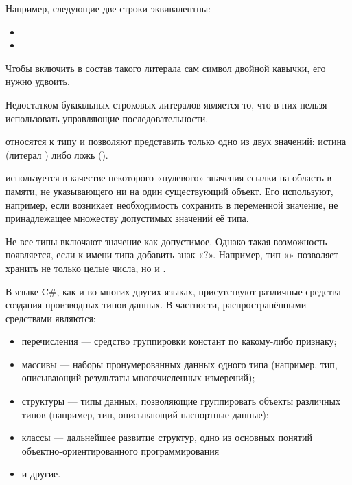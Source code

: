 Например, следующие две строки эквивалентны:
\begin{itemize}
\item{}
\item{}
\end{itemize}

Чтобы включить в состав такого литерала сам символ двойной кавычки,
его нужно удвоить.

Недостатком буквальных строковых литералов является то, что в них
нельзя использовать управляющие последовательности.


 относятся к типу
 и позволяют представить только одно из двух значений:
истина (литерал ) либо ложь ().


 используется в качестве
некоторого «нулевого» значения ссылки на область в памяти, не
указывающего ни на один существующий объект. Его используют, например,
если возникает необходимость сохранить в переменной значение, не
принадлежащее множеству допустимых значений её типа.

Не все типы включают значение  как допустимое. Однако такая
возможность появляется, если к имени типа добавить знак «?». Например,
тип «» позволяет хранить не только целые числа, но и
.


В языке C\#, как и во многих других языках, присутствуют различные
средства создания производных типов данных. В частности, распространёнными
средствами являются:
\begin{itemize}
\item перечисления — средство группировки констант по какому-либо
  признаку;
\item массивы — наборы пронумерованных данных одного типа (например,
  тип, описывающий результаты многочисленных измерений);
\item структуры — типы данных, позволяющие группировать объекты
  различных типов (например, тип, описывающий паспортные данные);
\item классы — дальнейшее развитие структур, одно из основных понятий
  объектно-ориентированного программирования
\item и другие.
\end{itemize}

